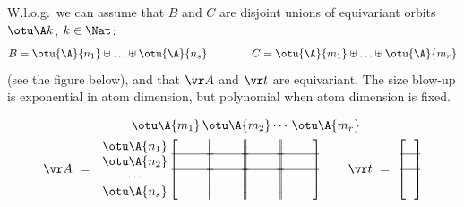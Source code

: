 \begin{lemma} \label{lem:wlog}
W.l.o.g.~we can assume that $B$ and $C$ are disjoint unions of equivariant orbits $\otu \A k$, $k\in\Nat$:
\begin{align} \label{eq:eqorbits}
\begin{aligned}
B =  
\otu {\A} {n_1}  \uplus  \ldots \uplus  \otu {\A} {n_s} \qquad\qquad 
C =  \otu {\A} {m_1} \uplus \ldots \uplus \otu {\A} {m_r}
\end{aligned}
\end{align}
(see the figure below),
and that $\vr A$ and $\vr t$ are equivariant. The size blow-up is exponential in
atom dimension, but polynomial when atom dimension is fixed.
\end{lemma}
%
\vspace{-4mm}
\begin{align*}
& \qquad\  \otu \A {m_1} \, \otu \A {m_2} \cdots \, \otu \A {m_r} \\
\vr A \ = \ \ \ &
\begin{matrix}
\otu \A {n_1} \\ \otu \A {n_2} \\ \cdots \\ \otu \A {n_s}
\end{matrix}
\left[
\begin{matrix}
\ \ \ \ \ \ \ \\ \hline
\\ \hline
\\ \hline
\ \ 
\end{matrix}
\right\rvert
\hspace{-1.25mm}
\left\rvert
\begin{matrix}
\ \ \ \ \ \ \  \\ \hline
\\ \hline
\\ \hline
\ \ 
\end{matrix}
\right\rvert
\hspace{-1.25mm}
\left\rvert
\begin{matrix}
\ \ \ \ \ \ \ \\ \hline
\\ \hline
\\ \hline
\ \ 
\end{matrix}
\right\rvert
\hspace{-1.25mm}
\left\rvert
\begin{matrix}
\ \ \ \ \ \ \ \\ \hline
\\ \hline
\\ \hline
\ \ 
\end{matrix}
\right]
\qquad
\vr t \ = \ \begin{bmatrix}
\ \ \\ \hline
\\ \hline
\\ \hline
\ \ 
\end{bmatrix}
\end{align*}
\vspace{1mm}

